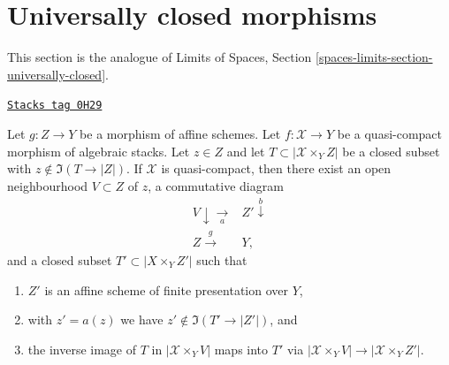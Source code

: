 \section{Universally closed morphisms}
\label{stacks-limits-section-universally-closed}
This section is the analogue of Limits of Spaces, Section
\ref{spaces-limits-section-universally-closed}.

\begin{lemma}[Separate]
\label{stacks-limits-lemma-separate}
\href{https://stacks.math.columbia.edu/tag/0H29}{\texttt{Stacks tag 0H29}}

Let $g : Z \to Y$ be a morphism of affine schemes.
Let $f : \mathcal{X} \to Y$ be a quasi-compact morphism of algebraic stacks.
Let $z \in Z$ and let $T \subset |\mathcal{X} \times_Y Z|$
be a closed subset with $z \not \in \Im(T \to |Z|)$.
If $\mathcal{X}$ is quasi-compact, then there exist
an open neighbourhood $V \subset Z$ of $z$,
a commutative diagram
$$
\begin{array}{cc}V \downarrow\underset{a}{\longrightarrow} & Z' \overset{b}{\downarrow} \\ Z \overset{g}{\longrightarrow} & Y,\end{array}
$$
and a closed subset $T' \subset |X \times_Y Z'|$ such that
\begin{enumerate}
\item $Z'$ is an affine scheme of finite presentation over $Y$,
\item with $z' = a(z)$ we have $z' \not \in \Im(T' \to |Z'|)$, and
\item the inverse image of $T$ in $|\mathcal{X} \times_Y V|$
maps into $T'$ via $|\mathcal{X} \times_Y V| \to |\mathcal{X} \times_Y Z'|$.
\end{enumerate}
\end{lemma}

